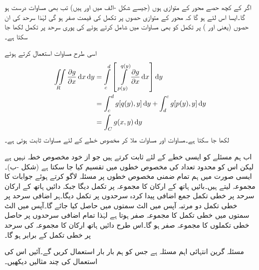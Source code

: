 اگر  کے کچھ حصے  محور کے متوازی ہوں (جیسے شکل -الف میں  اور  ہیں) تب بھی  مساوات  درست ہو گا۔ایسا اس لئے ہو گا کہ  محور کے متوازی حصوں پر تکمل کی قیمت صفر ہو گی لہٰذا سرحد کی ان حصوں (یعنی  اور   ) پر تکمل  کو بھی مساوات  میں شامل کرتے ہوئے  کی پوری سرحد پر تکمل لکھا جا سکتا ہے۔

اسی طرح مساوات  استعمال کرتے ہوئے
\begin{gather}
\begin{aligned}\label{مساوات_خطی_تکمل_مسئلہ_گرین_ثبوت_ت}
\iint\limits_R \frac{\partial g}{\partial x}\dif x\dif y&=\int\limits_c^d \left[\,\,\int\limits_{p(y)}^{q(y)}\frac{\partial g}{\partial x}\dif x\right]\dif y\\
&=\int_c^d g[q(y),y]\dif y+\int_d^c g[p(y),y]\dif y\\
&=\int_C g(x,y)\dif y
\end{aligned}
\end{gather}
لکھا جا سکتا ہے۔مساوات  اور مساوات   ملا کر مخصوص خطے کے لئے مساوات  ثابت ہوتی ہے۔

اب ہم مسئلے کو ایسی خطے کے لئے ثابت کرتے ہیں جو از خود مخصوص خطہ نہیں ہے لیکن اس کو محدود تعداد کی مخصوص خطوں میں تقسیم کیا جا سکتا ہے (شکل -ب)۔ایسی صورت میں ہم تمام ضمنی مخصوص خطوں پر مسئلہ لاگو کرتے ہوئے جوابات کا مجموعہ لیتے ہیں۔بائیں ہاتھ کے ارکان کا مجموعہ   پر تکمل دیگا جبکہ دائیں ہاتھ کے ارکان سرحد  پر خطی تکمل جمع اضافی پیدا کردہ سرحدوں پر تکمل دیگا۔ہر اضافی سرحد پر خطی تکمل دو مرتبہ آپس میں الٹ سمتوں میں حاصل کیا جائے گا۔آپس میں الٹ سمتوں میں خطی تکمل کا مجموعہ صفر ہوتا ہے لہٰذا تمام اضافی سرحدوں پر حاصل خطی تکملوں کا مجموعہ صفر ہو گا۔اس طرح دائیں ہاتھ ارکان کا مجموعہ  کی سرحد  پر خطی تکمل کے برابر ہو گا۔ 

مسئلہ گرین انتہائی اہم مسئلہ ہے جس کو ہم بار بار استعمال کریں گے۔آئیں اس کی استعمال کی چند مثالیں دیکھیں۔

